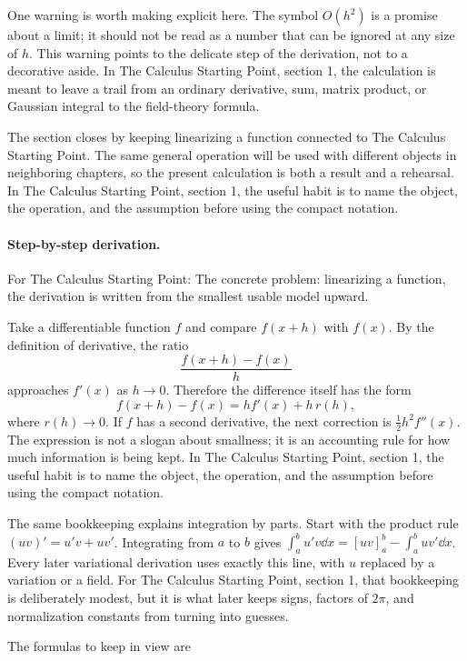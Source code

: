 One warning is worth making explicit here.  The symbol \(O(h^2)\) is a promise about a limit; it should not be read as a number that can be ignored at any size of \(h\).  This warning points to the delicate step of the derivation, not to a decorative aside.  In The Calculus Starting Point, section 1, the calculation is meant to leave a trail from an ordinary derivative, sum, matrix product, or Gaussian integral to the field-theory formula.

The section closes by keeping linearizing a function connected to The Calculus Starting Point.  The same general operation will be used with different objects in neighboring chapters, so the present calculation is both a result and a rehearsal.  In The Calculus Starting Point, section 1, the useful habit is to name the object, the operation, and the assumption before using the compact notation.



\paragraph{Step-by-step derivation.}

For The Calculus Starting Point: The concrete problem: linearizing a function, the derivation is written from the smallest usable model upward.

Take a differentiable function \(f\) and compare \(f(x+h)\) with \(f(x)\).  By the definition of derivative, the ratio
\[
  \frac{f(x+h)-f(x)}{h}
\]
approaches \(f'(x)\) as \(h\to0\).  Therefore the difference itself has the form
\[
  f(x+h)-f(x)=hf'(x)+h\,r(h),
\]
where \(r(h)\to0\).  If \(f\) has a second derivative, the next correction is \(\frac12h^2f''(x)\).  The expression is not a slogan about smallness; it is an accounting rule for how much information is being kept.  In The Calculus Starting Point, section 1, the useful habit is to name the object, the operation, and the assumption before using the compact notation.

The same bookkeeping explains integration by parts.  Start with the product rule \((uv)'=u'v+uv'\).  Integrating from \(a\) to \(b\) gives \(\int_a^b u'v\dd x=[uv]_a^b-\int_a^buv'\dd x\).  Every later variational derivation uses exactly this line, with \(u\) replaced by a variation or a field.  For The Calculus Starting Point, section 1, that bookkeeping is deliberately modest, but it is what later keeps signs, factors of \(2\pi\), and normalization constants from turning into guesses.

The formulas to keep in view are

